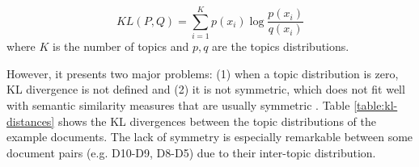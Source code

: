 \begin{equation}
KL(P,Q) = \sum\limits_{i=1}^K p(x_{i}) \log \frac{p(x_{i})}{q(x_{i})}
\label{eq:kl}
\end{equation}
where  $K$ is the number of topics and $p,q$ are the topics distributions.

However, it presents two major problems: (1) when a topic distribution is zero, KL divergence is not defined and (2) it is not symmetric, which does not fit well with semantic similarity measures that are usually symmetric \citep{Rus2013}. Table \ref{table:kl-distances} shows the KL divergences between the topic distributions of the example documents. The lack of symmetry is especially remarkable between some document pairs (e.g. D10-D9, D8-D5) due to their inter-topic distribution.



